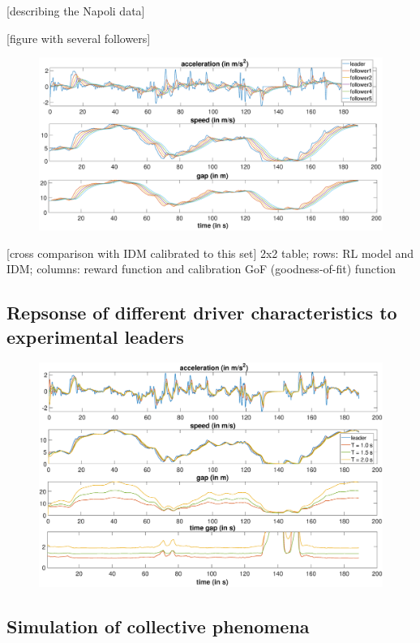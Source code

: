 \documentclass[review]{elsarticle}
\begin{document}
[describing the Napoli data]

[figure with several followers]

\begin{figure}
	\centering
	\includegraphics[width=12cm]{images/PunzoKolonne}
	\caption{}
	\label{fig:PunzoKolonne}
\end{figure}

[cross comparison with IDM calibrated to this set]
2x2 table; rows: RL model and IDM;
columns: reward function and calibration GoF (goodness-of-fit) function

\subsection{Repsonse of different driver characteristics to experimental leaders }

\begin{figure}
	\centering
	\includegraphics[width=12cm]{images/differentT}
	\caption{}
	\label{fig:differentT}
\end{figure}


\subsection{Simulation of collective phenomena}
\end{document}
